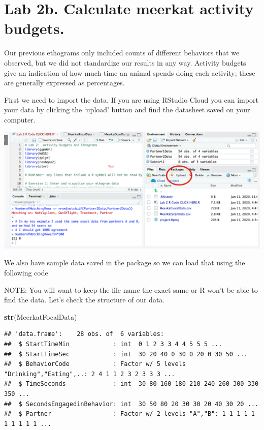 \documentclass[]{book}
\newenvironment{Shaded}{\begin{snugshade}}{\end{snugshade}}
\newcommand{\KeywordTok}[1]{\textcolor[rgb]{0.13,0.29,0.53}{\textbf{#1}}}
\newcommand{\NormalTok}[1]{#1}
\begin{document}
\hypertarget{lab-2b.-calculate-meerkat-activity-budgets.}{%
\section*{Lab 2b. Calculate meerkat activity budgets.}\label{lab-2b.-calculate-meerkat-activity-budgets.}}

Our previous ethograms only included counts of different behaviors that we observed, but we did not standardize our results in any way. Activity budgets give an indication of how much time an animal spends doing each activity; these are generally expressed as percentages.

First we need to import the data. If you are using RStudio Cloud you can import your data by clicking the `upload' button and find the datasheet saved on your computer.

\includegraphics[width=0.75\linewidth]{RstudioCloudImport}

We also have sample data saved in the package so we can load that using the following code

NOTE: You will want to keep the file name the exact same or R won't be able to find the data.
Let's check the structure of our data.

\begin{Shaded}
\begin{Highlighting}[]
\KeywordTok{str}\NormalTok{(MeerkatFocalData)}
\end{Highlighting}
\end{Shaded}

\begin{verbatim}
## 'data.frame':    28 obs. of  6 variables:
##  $ StartTimeMin            : int  0 1 2 3 3 4 4 5 5 5 ...
##  $ StartTimeSec            : int  30 20 40 0 30 0 20 0 30 50 ...
##  $ BehaviorCode            : Factor w/ 5 levels "Drinking","Eating",..: 2 4 1 1 2 3 2 3 3 3 ...
##  $ TimeSeconds             : int  30 80 160 180 210 240 260 300 330 350 ...
##  $ SecondsEngagedinBehavior: int  30 50 80 20 30 30 20 40 30 20 ...
##  $ Partner                 : Factor w/ 2 levels "A","B": 1 1 1 1 1 1 1 1 1 1 ...
\end{verbatim}
\end{document}
